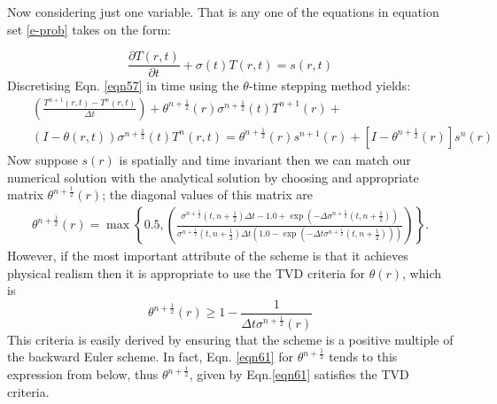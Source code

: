 Now considering just one variable. That is any one of
the equations in equation set \ref{e-prob} takes on the form:

\begin{equation}
\displaystyle\frac{\partial {T}\left({r},t\right)} {\partial t}+{\sigma}\left(t\right){T}\left({r},t\right)={s}\left({r},t\right)
\label{eqn57}
\end{equation}
Discretising Eqn. \ref{eqn57} in time using the $\theta$-time stepping method yields:
\begin{eqnarray}
&&\left(\displaystyle\frac{{{T}}^{n+1}\left({r},t\right)-{{T}}^{n}\left({r},t\right)}{\Delta t}\right)+{\theta}^{n+\frac{1}{2}}\left({r}\right){\sigma}^{n+\frac{1}{2}}\left(t\right){{T}}^{n+1}\left({r}\right)+   \nonumber \\
&& \left({I}-{\theta}\left({r},t\right)\right){\sigma}^{n+\frac{1}{2}}\left(t\right){{T}}^{n}\left({r},t\right)=  {\theta}^{n+\frac{1}{2}}\left({r}\right){s}^{n+1}\left({r}\right)+\left[{I}-{\theta}^{n+\frac{1}{2}}\left({r}\right)\right]{s}^{n}\left({r}\right)
\label{eqn60}
\end{eqnarray}
Now suppose ${s}\left({r}\right)$ is spatially and time invariant then we can match our numerical solution with the analytical solution by choosing and appropriate matrix ${\theta}^{n+\frac{1}{2}}\left({r}\right)$; the diagonal values of this matrix are
\begin{eqnarray}
{\theta}^{n+\frac{1}{2}}\left({r}\right) = \max \left\{
0.5,
\left(\displaystyle\frac
{{\sigma}^{n+\frac{1}{2}}\left(t,n+\frac{1}{2}\right)\Delta t-1.0+\exp\left(-\Delta{\sigma}^{n+\frac{1}{2}}\left(t,n+\frac{1}{2}\right)\right)}
{{\sigma}^{n+\frac{1}{2}}\left(t,n+\frac{1}{2}\right)\Delta t\left(1.0-\exp\left(-\Delta t{\sigma}^{n+\frac{1}{2}}\left(t,n+\frac{1}{2}\right) \right)\right) }
\right)
\right\}.
\label{eqn61}
\end{eqnarray}
However, if the most important attribute of the scheme is that it achieves physical realism then it is appropriate to use the TVD criteria for ${\theta}\left({r}\right)$, which is
\begin{equation}
{\theta}^{n+\frac{1}{2}} \left({r}\right) \geq 1-\displaystyle\frac{1}{\Delta t {\sigma}^{n+\frac{1}{2}}\left({r}\right)}
\label{eqn62}
\end{equation}
This criteria is easily derived by ensuring that the scheme is a positive multiple of the backward Euler scheme.  In fact, Eqn. \ref{eqn61} for $\theta^{n+\frac{1}{2}}$ tends to this expression from below, thus $\theta^{n+\frac{1}{2}}$, given by Eqn.\ref{eqn61} satisfies the TVD criteria.

